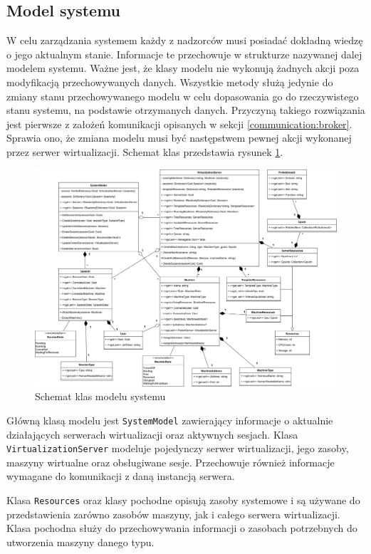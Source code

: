 \documentclass[../opis-rozwiazania.tex]{subfiles}
\begin{document}
\subsection{Model systemu}

W celu zarządzania systemem każdy z nadzorców musi posiadać dokładną wiedzę o jego aktualnym stanie. Informacje te przechowuje w strukturze nazywanej dalej modelem systemu. Ważne jest, że klasy modelu nie wykonują żadnych akcji poza modyfikacją przechowywanych danych. Wszystkie metody służą jedynie do zmiany stanu przechowywanego modelu w celu dopasowania go do rzeczywistego stanu systemu, na podstawie otrzymanych danych. Przyczyną takiego rozwiązania jest pierwsze z założeń komunikacji opisanych w sekcji \ref{communication:broker}. Sprawia ono, że zmiana modelu musi być następstwem pewnej akcji wykonanej przez serwer wirtualizacji. Schemat klas przedstawia rysunek \ref{figure:architecture:model}.

\begin{figure}[h]
  \centering
  \includegraphics[width=\textwidth]{../diagrams/class_diagrams/system_model_v2.png}
  \caption{Schemat klas modelu systemu}
  \label{figure:architecture:model}
\end{figure}

Główną klasą modelu jest \texttt{SystemModel} zawierający informacje o aktualnie działających serwerach wirtualizacji oraz aktywnych sesjach. Klasa \texttt{VirtualizationServer} modeluje pojedynczy serwer wirtualizacji, jego zasoby, maszyny wirtualne oraz obsługiwane sesje. Przechowuje również informacje wymagane do komunikacji z daną instancją serwera.

Klasa \texttt{Resources} oraz klasy pochodne opisują zasoby systemowe i są używane do przedstawienia zarówno zasobów maszyny, jak i całego serwera wirtualizacji. Klasa pochodna \texttt{} służy do przechowywania informacji o zasobach potrzebnych do utworzenia maszyny danego typu.
\end{document}

